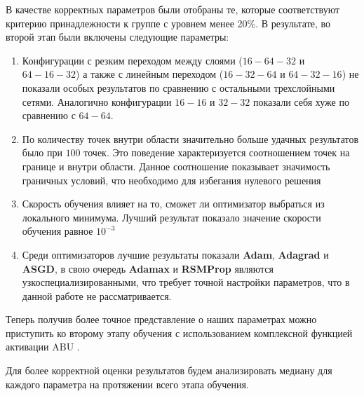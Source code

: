 В качестве корректных параметров были отобраны те, которые соответствуют критерию
принадлежности к группе с уровнем менее 20\%. В результате, во второй этап были
включены следующие параметры:
\begin{enumerate}
    \item Конфигурации с резким переходом между слоями ($16-64-32$ и $64-16-32$) а также
    с линейным переходом ($16-32-64$ и $64-32-16$) не показали особых результатов по
    сравнению с остальными трехслойными сетями. Аналогично конфигурации
    $16-16$ и $32-32$ показали себя хуже по сравнению с $64-64$.
    \item По количеству точек внутри области значительно больше удачных
    результатов было при $100$ точек. Это поведение характеризуется 
    соотношением точек на границе и внутри области. Данное соотношение 
    показывает значимость граничных условий, что необходимо для избегания
    нулевого решения
    \item Скорость обучения влияет на то, сможет ли оптимизатор 
    выбраться из локального минимума. Лучший результат показало значение
    скорости обучения равное $10^{-3}$
    \item Среди оптимизаторов лучшие результаты показали \textbf{Adam}, \textbf{Adagrad} и
    \textbf{ASGD}, в свою очередь \textbf{Adamax} и \textbf{RSMProp} являются узкоспециализированными,
    что требует точной настройки параметров, что в данной работе не рассматривается.
\end{enumerate} 

Теперь получив более точное представление о наших параметрах можно приступить
ко второму этапу обучения с использованием комплексной функцией активации ABU \cite{Sutfeld2018-io}.

Для более корректной оценки результатов будем анализировать медиану для каждого параметра
на протяжении всего этапа обучения.

% 
% 
% 
% 
% 